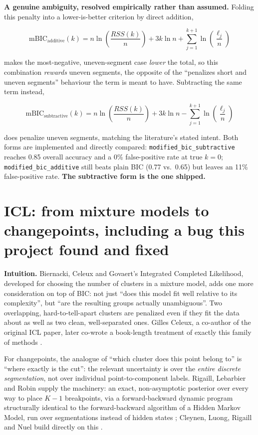 \documentclass[11pt]{article}
\newcommand{\code}[1]{\texttt{#1}}
\begin{document}
\textbf{A genuine ambiguity, resolved empirically rather than assumed.}
Folding this penalty into a lower-is-better criterion by direct addition,

\begin{equation}
\mathrm{mBIC}_{\text{additive}}(k) = n \ln\!\left(\frac{RSS(k)}{n}\right) + 3k \ln n + \sum_{j=1}^{k+1} \ln\!\left(\frac{\ell_j}{n}\right)
\end{equation}

makes the most-negative, uneven-segment case \emph{lower} the total, so this
combination \emph{rewards} uneven segments, the opposite of the
``penalizes short and uneven segments'' behaviour the term is meant to
have. Subtracting the same term instead,

\begin{equation}
\mathrm{mBIC}_{\text{subtractive}}(k) = n \ln\!\left(\frac{RSS(k)}{n}\right) + 3k \ln n - \sum_{j=1}^{k+1} \ln\!\left(\frac{\ell_j}{n}\right)
\end{equation}

does penalize uneven segments, matching the literature's stated intent.
Both forms are implemented and directly compared:
\code{modified\_bic\_subtractive} reaches 0.85 overall accuracy and a 0\%
false-positive rate at $\text{true } k = 0$; \code{modified\_bic\_additive}
still beats plain BIC (0.77 vs.\ 0.65) but leaves an 11\% false-positive
rate. \textbf{The subtractive form is the one shipped.}

\section{ICL: from mixture models to changepoints, including a bug this project found and fixed}

\textbf{Intuition.} Biernacki, Celeux and Govaert's Integrated Completed
Likelihood, developed for choosing the number of clusters in a mixture
model, adds one more consideration on top of BIC: not just ``does this
model fit well relative to its complexity'', but ``are the resulting
groups actually unambiguous''. Two overlapping, hard-to-tell-apart clusters
are penalized even if they fit the data about as well as two clean,
well-separated ones. Gilles Celeux, a co-author of the original ICL paper,
later co-wrote a book-length treatment of exactly this family of methods
\citep{bouveyron2021mbc}.

For changepoints, the analogue of ``which cluster does this point belong
to'' is ``where exactly is the cut'': the relevant uncertainty is over the
\emph{entire discrete segmentation}, not over individual point-to-component
labels. Rigaill, Lebarbier and Robin supply the machinery: an exact,
non-asymptotic posterior over every way to place $K-1$ breakpoints, via a
forward-backward dynamic program structurally identical to the
forward-backward algorithm of a Hidden Markov Model, run over segmentations
instead of hidden states \citeyearpar{rigaill2012}; Cleynen, Luong, Rigaill
and Nuel build directly on this \citeyearpar{cleynen2013}.
\end{document}
